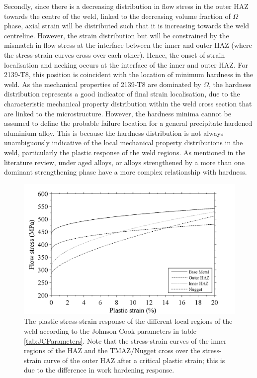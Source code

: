 Secondly, since there is a decreasing distribution in flow stress in the outer HAZ towards the centre of the weld, linked to the decreasing volume fraction of $\Omega$ phase, axial strain will be distributed such that it is increasing towards the weld centreline. However, the strain distribution but will be constrained by the mismatch in flow stress at the interface between the inner and outer HAZ (where the stress-strain curves cross over each other). Hence, the onset of strain localisation and necking occurs at the interface of the inner and outer HAZ. For 2139-T8, this position is coincident with the location of minimum hardness in the weld. As the mechanical properties of 2139-T8 are dominated by $\Omega$, the hardness distribution represents a good indicator of final strain localisation, due to the characteristic mechanical property distribution within the weld cross section that are linked to the microstructure. However, the hardness minima cannot be assumed to define the probable failure location for a general precipitate hardened aluminium alloy. This is because the hardness distribution is not always unambiguously indicative of the local mechanical property distributions in the weld, particularly the plastic response of the weld regions. As mentioned in the literature review, under aged alloys, or alloys strengthened by a more than one dominant strengthening phase have a more complex relationship with hardness.

\begin{figure}[h!]
	\centering
	\includegraphics[width=.8\linewidth]{Figures/ModellingMethod/ConstitutiveModelsaltered}
	\caption[Local stress strain response of weld regions]{The plastic stress-strain response of the different local regions of the weld according to the Johnson-Cook parameters in table \ref{tab:JCParameters}. Note that the stress-strain curves of the inner regions of the HAZ and the TMAZ/Nugget cross over the stress-strain curve of the outer HAZ after a critical plastic strain; this is due to the difference in work hardening response.}
	\label{fig:ConstitutiveModels}
\end{figure}

